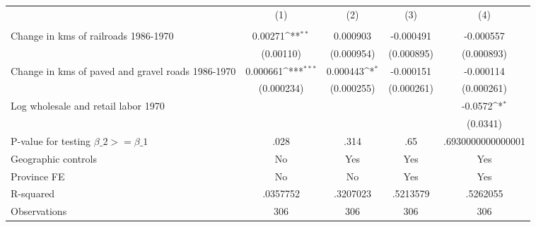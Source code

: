 {
\def\sym#1{\ifmmode^{#1}\else\(^{#1}\)\fi}
\begin{tabular}{l*{4}{c}}
\hline\hline
                &\multicolumn{1}{c}{(1)}&\multicolumn{1}{c}{(2)}&\multicolumn{1}{c}{(3)}&\multicolumn{1}{c}{(4)}\\
                &\multicolumn{1}{c}{}&\multicolumn{1}{c}{}&\multicolumn{1}{c}{}&\multicolumn{1}{c}{}\\
\hline
Change in kms of railroads 1986-1970&  0.00271\sym{**} & 0.000903         &-0.000491         &-0.000557         \\
                &(0.00110)         &(0.000954)         &(0.000895)         &(0.000893)         \\
[1em]
Change in kms of paved and gravel roads 1986-1970& 0.000661\sym{***}& 0.000443\sym{*}  &-0.000151         &-0.000114         \\
                &(0.000234)         &(0.000255)         &(0.000261)         &(0.000261)         \\
[1em]
Log wholesale and retail labor 1970&                  &                  &                  &  -0.0572\sym{*}  \\
                &                  &                  &                  & (0.0341)         \\
\hline
P-value for testing $\beta\_{2} >= \beta\_{1}$&     .028         &     .314         &      .65         &.6930000000000001         \\
Geographic controls&       No         &      Yes         &      Yes         &      Yes         \\
Province FE     &       No         &       No         &      Yes         &      Yes         \\
R-squared       & .0357752         & .3207023         & .5213579         & .5262055         \\
Observations    &      306         &      306         &      306         &      306         \\
\hline\hline
\end{tabular}
}
